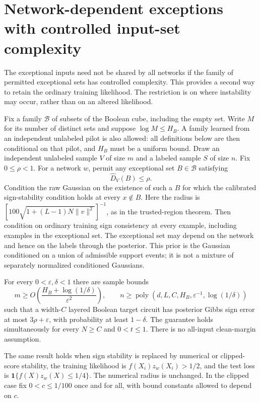 \section{Network-dependent exceptions with controlled input-set complexity}
\label{sec:low-complexity-exceptions}

The exceptional inputs need not be shared by all networks if the family of
permitted exceptional sets has controlled complexity. This provides a
second way to retain the ordinary training likelihood. The restriction is
on where instability may occur, rather than on an altered likelihood.

Fix a family $\mathcal B$ of subsets of the Boolean cube, including the
empty set. Write $M$ for its number of distinct sets and suppose
$\log M\le H_B$. A family learned from an independent unlabeled pilot is
also allowed: all definitions below are then conditional on that pilot,
and $H_B$ must be a uniform bound. Draw an independent unlabeled sample
$V$ of size $m$ and a labeled sample $S$ of size $n$. Fix $0\le\rho<1$.
For a network $w$, permit any exceptional set $B\in\mathcal B$ satisfying
\[
 \widehat D_V(B)\le\rho.
\]
Condition the raw Gaussian on the existence of such a $B$ for which the
calibrated sign-stability condition holds at every $x\notin B$.
Here the radius is $[100\sqrt{1+(L-1)N\|v\|^2}]^{-1}$, as in the
trusted-region theorem. Then condition on ordinary training sign
consistency at every example, including examples in the exceptional set.
The exceptional set may depend on the network and hence on the labels
through the posterior. This prior is the Gaussian conditioned on a union
of admissible support events; it is not a mixture of separately normalized
conditioned Gaussians.

\begin{theorem}
\label{thm:low-complexity-exceptions}
For every $0<\varepsilon,\delta<1$ there are sample bounds
\[
 m\ge O\!\left(\frac{H_B+\log(1/\delta)}{\varepsilon^2}\right),
 \qquad
 n\ge\operatorname{poly}
       (d,L,C,H_B,\varepsilon^{-1},\log(1/\delta))
\]
such that a width-$C$ layered Boolean target circuit has posterior Gibbs
sign error at most $3\rho+\varepsilon$, with probability at least
$1-\delta$. The guarantee holds simultaneously for every $N\ge C$ and
$0<t\le1$. There is no all-input clean-margin assumption.

The same result holds when sign stability is replaced by numerical or
clipped-score stability, the training likelihood is
$f(X_i)z_w(X_i)>1/2$, and the test loss is
$\mathbf1\{f(X)z_w(X)\le1/4\}$. The numerical radius is unchanged.
In the clipped case fix $0<c\le1/100$ once and for all, with bound
constants allowed to depend on $c$.
\end{theorem}

